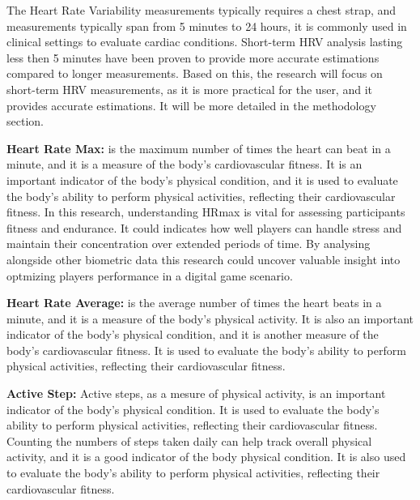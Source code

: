     The Heart Rate Variability measurements typically requires a chest strap, and measurements typically span from 5 minutes to 24 hours, 
    it is commonly used in clinical settings to evaluate cardiac conditions.\cite{malik1996heart} Short-term HRV analysis lasting less then 
    5 minutes have been proven to provide more accurate estimations compared to longer measurements.\cite{mcnames2006reliability}
    Based on this, the research will focus on short-term HRV measurements, as it is more practical for the user, and it provides accurate 
    estimations. It will be more detailed in the methodology section.

    \textbf{Heart Rate Max:} is the maximum number of times the heart can beat in a minute, and it is a measure of the body's 
    cardiovascular fitness. It is an important indicator of the body's physical condition, and it is used to evaluate the body's ability 
    to perform physical activities, reflecting their cardiovascular fitness. In this research, understanding HRmax is vital for assessing 
    participants fitness and endurance. It could indicates how well players can handle stress and maintain their concentration over 
    extended periods of time. By analysing alongside other biometric data this research could uncover valuable insight into optmizing 
    players performance in a digital game scenario.

    \textbf{Heart Rate Average:} is the average number of times the heart beats in a minute, and it is a measure of the body's physical 
    activity. It is also an important indicator of the body's physical condition,     and it is another measure of the body's 
    cardiovascular fitness. It is used to evaluate the body's ability to perform physical activities, reflecting their cardiovascular 
    fitness.

    \textbf{Active Step:} Active steps, as a mesure of physical activity, is an important indicator of the body's physical condition. It is 
    used to evaluate the body's ability to perform physical activities, reflecting their cardiovascular fitness. Counting the numbers of 
    steps taken daily can help track overall physical activity, and it is a good indicator of the body physical condition. It is also used 
    to evaluate the body's ability to perform physical activities, reflecting their cardiovascular fitness.
    

